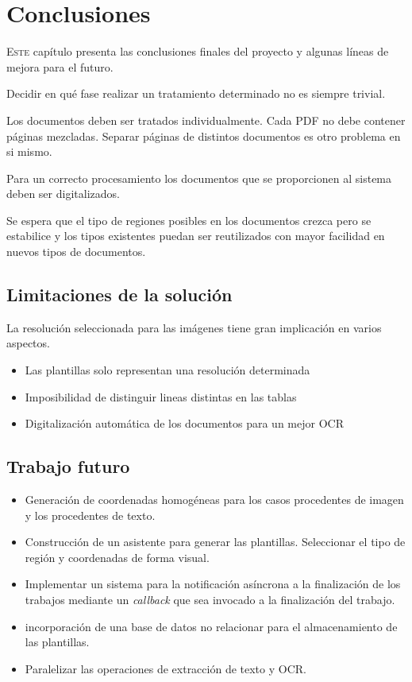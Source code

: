 
\chapter{Conclusiones}
\label{chap:conclusiones}

\lettrine{E}{ste} capítulo presenta las conclusiones finales del proyecto y algunas líneas de mejora para el futuro.

Decidir en qué fase realizar un tratamiento determinado no es siempre trivial.

Los documentos deben ser tratados individualmente. Cada PDF no debe contener páginas mezcladas. Separar páginas de distintos documentos es otro problema en si mismo.

Para un correcto procesamiento los documentos que se proporcionen 
al sistema deben ser digitalizados.

Se espera que el tipo de regiones posibles en los documentos crezca pero se estabilice y los tipos existentes puedan ser reutilizados con mayor facilidad en nuevos tipos de documentos.

\section{Limitaciones de la solución}
La resolución seleccionada para las imágenes tiene gran implicación en varios aspectos.
\begin{itemize}
    \item Las plantillas solo representan una resolución determinada
    \item Imposibilidad de distinguir lineas distintas en las tablas
    \item Digitalización automática de los documentos para un mejor OCR
\end{itemize}

\section{Trabajo futuro}

\begin{itemize}
    \item Generación de coordenadas homogéneas para los casos procedentes de imagen y los procedentes de texto.
    \item Construcción de un asistente para generar las plantillas. Seleccionar el tipo de región y coordenadas de forma visual.
    \item Implementar un sistema para la notificación asíncrona a la finalización de los trabajos mediante un \emph{callback} que sea invocado a la finalización del trabajo.
    \item incorporación de una base de datos no relacionar para el almacenamiento de las plantillas.
    \item Paralelizar las operaciones de extracción de texto y OCR.
\end{itemize}


